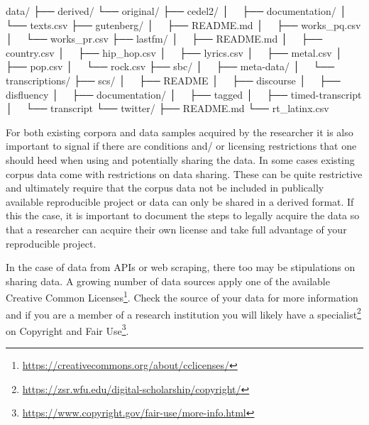\documentclass[
]{article}
\newenvironment{Shaded}{\begin{snugshade}}{\end{snugshade}}
\newcommand{\ExtensionTok}[1]{#1}
\newcommand{\NormalTok}[1]{#1}
\DeclareRobustCommand{\href}[2]{#2\footnote{\url{#1}}}
\begin{document}
\begin{Shaded}
\begin{Highlighting}[]
\ExtensionTok{data/}
\ExtensionTok{├──}\NormalTok{ derived/}
\ExtensionTok{└──}\NormalTok{ original/}
    \ExtensionTok{├──}\NormalTok{ cedel2/}
    \ExtensionTok{│  }\NormalTok{ ├── documentation/}
    \ExtensionTok{│  }\NormalTok{ └── texts.csv}
    \ExtensionTok{├──}\NormalTok{ gutenberg/}
    \ExtensionTok{│  }\NormalTok{ ├── README.md}
    \ExtensionTok{│  }\NormalTok{ ├── works\_pq.csv}
    \ExtensionTok{│  }\NormalTok{ └── works\_pr.csv}
    \ExtensionTok{├──}\NormalTok{ lastfm/}
    \ExtensionTok{│  }\NormalTok{ ├── README.md}
    \ExtensionTok{│  }\NormalTok{ ├── country.csv}
    \ExtensionTok{│  }\NormalTok{ ├── hip\_hop.csv}
    \ExtensionTok{│  }\NormalTok{ ├── lyrics.csv}
    \ExtensionTok{│  }\NormalTok{ ├── metal.csv}
    \ExtensionTok{│  }\NormalTok{ ├── pop.csv}
    \ExtensionTok{│  }\NormalTok{ └── rock.csv}
    \ExtensionTok{├──}\NormalTok{ sbc/}
    \ExtensionTok{│  }\NormalTok{ ├── meta{-}data/}
    \ExtensionTok{│  }\NormalTok{ └── transcriptions/}
    \ExtensionTok{├──}\NormalTok{ scs/}
    \ExtensionTok{│  }\NormalTok{ ├── README}
    \ExtensionTok{│  }\NormalTok{ ├── discourse}
    \ExtensionTok{│  }\NormalTok{ ├── disfluency}
    \ExtensionTok{│  }\NormalTok{ ├── documentation/}
    \ExtensionTok{│  }\NormalTok{ ├── tagged}
    \ExtensionTok{│  }\NormalTok{ ├── timed{-}transcript}
    \ExtensionTok{│  }\NormalTok{ └── transcript}
    \ExtensionTok{└──}\NormalTok{ twitter/}
        \ExtensionTok{├──}\NormalTok{ README.md}
        \ExtensionTok{└──}\NormalTok{ rt\_latinx.csv}
\end{Highlighting}
\end{Shaded}

For both existing corpora and data samples acquired by the researcher it is also important to signal if there are conditions and/ or licensing restrictions that one should heed when using and potentially sharing the data. In some cases existing corpus data come with restrictions on data sharing. These can be quite restrictive and ultimately require that the corpus data not be included in publically available reproducible project or data can only be shared in a derived format. If this the case, it is important to document the steps to legally acquire the data so that a researcher can acquire their own license and take full advantage of your reproducible project.

In the case of data from APIs or web scraping, there too may be stipulations on sharing data. A growing number of data sources apply one of \href{https://creativecommons.org/about/cclicenses/}{the available Creative Common Licenses}. Check the source of your data for more information and if you are a member of a research institution you will likely have a \href{https://zsr.wfu.edu/digital-scholarship/copyright/}{specialist} on \href{https://www.copyright.gov/fair-use/more-info.html}{Copyright and Fair Use}.
\end{document}
